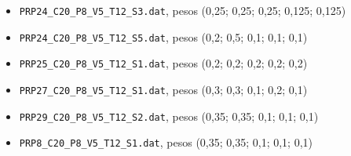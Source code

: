 \begin{itemize}[leftmargin=*]
  \item \texttt{PRP24\_C20\_P8\_V5\_T12\_S3.dat}, pesos (0,25; 0,25; 0,25; 0,125; 0,125)
  \item \texttt{PRP24\_C20\_P8\_V5\_T12\_S5.dat}, pesos (0,2; 0,5; 0,1; 0,1; 0,1)
  \item \texttt{PRP25\_C20\_P8\_V5\_T12\_S1.dat}, pesos (0,2; 0,2; 0,2; 0,2; 0,2)
  \item \texttt{PRP27\_C20\_P8\_V5\_T12\_S1.dat}, pesos (0,3; 0,3; 0,1; 0,2; 0,1)
  \item \texttt{PRP29\_C20\_P8\_V5\_T12\_S2.dat}, pesos (0,35; 0,35; 0,1; 0,1; 0,1)
  \item \texttt{PRP8\_C20\_P8\_V5\_T12\_S1.dat}, pesos (0,35; 0,35; 0,1; 0,1; 0,1)
\end{itemize}
